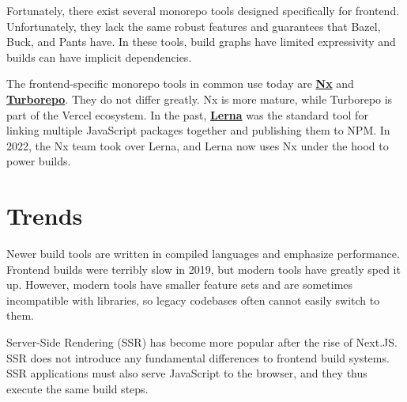 \documentclass{article}
\begin{document}
Fortunately, there exist several monorepo tools designed specifically for frontend. Unfortunately,
they lack the same robust features and guarantees that Bazel, Buck, and Pants have. In these tools,
build graphs have limited expressivity and builds can have implicit dependencies.

The frontend-specific monorepo tools in common use today are \href{https://nx.dev/}{\textbf{Nx}} and
\href{https://turbo.build/repo}{\textbf{Turborepo}}. They do not differ greatly. Nx is more mature,
while Turborepo is part of the Vercel ecosystem. In the past,
\href{https://lerna.js.org/}{\textbf{Lerna}} was the standard tool for linking multiple JavaScript
packages together and publishing them to NPM. In 2022, the Nx team took over Lerna, and Lerna now
uses Nx under the hood to power builds.

\section{Trends}

Newer build tools are written in compiled languages and emphasize performance. Frontend builds were
terribly slow in 2019, but modern tools have greatly sped it up. However, modern tools have smaller
feature sets and are sometimes incompatible with libraries, so legacy codebases often cannot easily
switch to them.

Server-Side Rendering (SSR) has become more popular after the rise of Next.JS. SSR does not
introduce any fundamental differences to frontend build systems. SSR applications must also serve
JavaScript to the browser, and they thus execute the same build steps.
\end{document}
